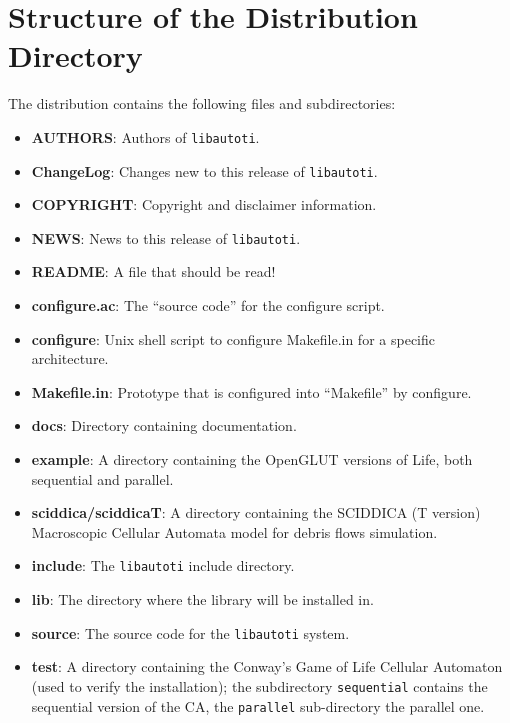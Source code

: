 \section{Structure of the Distribution Directory}

The distribution contains the following files and subdirectories:

\begin{itemize}

    \item \textbf{AUTHORS}: Authors of \verb"libautoti".

    \item \textbf{ChangeLog}: Changes new to this release of \verb"libautoti".

    \item \textbf{COPYRIGHT}: Copyright and disclaimer information.

    \item \textbf{NEWS}: News to this release of \verb"libautoti".

    \item \textbf{README}: A file that should be read!

    \item \textbf{configure.ac}: The ``source code'' for the configure script.

    \item \textbf{configure}: Unix shell script to configure Makefile.in for a specific architecture.

    \item \textbf{Makefile.in}: Prototype that is configured into ``Makefile'' by configure.

    \item \textbf{docs}: Directory containing documentation.

    \item \textbf{example}: A directory containing the OpenGLUT versions of Life, both sequential and parallel.

    \item \textbf{sciddica/sciddicaT}: A directory containing the SCIDDICA (T version) Macroscopic Cellular Automata model for debris flows simulation.

    \item \textbf{include}: The \verb"libautoti" include directory.

    \item \textbf{lib}: The directory where the library will be installed in.

    \item \textbf{source}: The source code for the \verb"libautoti" system.

    \item \textbf{test}: A directory containing the Conway's  Game of Life Cellular Automaton (used to verify the
    installation); the subdirectory \verb"sequential" contains the sequential version of the CA, the \verb"parallel"
    sub-directory the parallel one.

\end{itemize}


